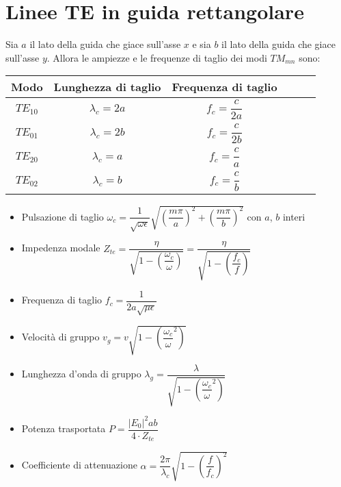 \documentclass{article}
\begin{document}
\section{Linee TE in guida rettangolare}
Sia \(a\) il lato della guida che giace sull'asse \(x\) e sia \(b\) il lato della guida che giace sull'asse \(y\). Allora le ampiezze e le frequenze di taglio dei modi \(TM_{mn} \) sono:
\vspace{15pt}
\begin{center}
	\begin{tabular}{|Sc|Sc|Sc|}
		\hline 
		Modo & Lunghezza di taglio & Frequenza di taglio \\ 
		\hline 	
		\(TE_{10}\) & \(\lambda_c = 2a\) & \(f_c = \dfrac{c}{2a}\) \\ 
		\hline 
		\(TE_{01}\) & \(\lambda_c = 2b\) & \(f_c = \dfrac{c}{2b}\) \\ 
		\hline 
		\(TE_{20}\) & \(\lambda_c = a\) & \(f_c = \dfrac{c}{a}\) \\ 
		\hline 
		\(TE_{02}\) & \(\lambda_c = b\) & \(f_c = \dfrac{c}{b}\) \\ 
		\hline 
	\end{tabular} 
\end{center}
\vspace{5pt}

\begin{itemize}
	\item Pulsazione di taglio \( \omega_c = \dfrac{1}{\sqrt{\omega \epsilon}} \sqrt{\left( \dfrac{m \pi}{a}\right)^2 + \left( \dfrac{m \pi}{b} \right)^2 }\) con \(a\), \(b\) interi
	\item Impedenza modale \( Z_{te} = \dfrac{\eta}{\sqrt{1-\left(\dfrac{\omega_c}{\omega} \right) }} = \dfrac{\eta}{\sqrt{1-\left(\dfrac{f_c}{f} \right) }} \)
	\item Frequenza di taglio \( f_c = \dfrac{1}{2a \sqrt{\mu \epsilon}} \)
	\item Velocità di gruppo \( v_g = v \sqrt{1- \left( \dfrac{\omega_c}{\omega} ^ 2 \right)} \)
	\item Lunghezza d'onda di gruppo \( \lambda_g = \dfrac{\lambda}{\sqrt{1- \left( \dfrac{\omega_c}{\omega} ^ 2 \right)}}\)
	\item Potenza trasportata \( P = \dfrac{|E_0|^2 a b}{4 \cdot Z_{te}} \)
	\item Coefficiente di attenuazione \( \alpha = \dfrac{2 \pi}{\lambda_c} \sqrt{1 - \left( \dfrac{f}{f_c} \right) ^ 2} \)
\end{itemize}


\newpage
\end{document}
